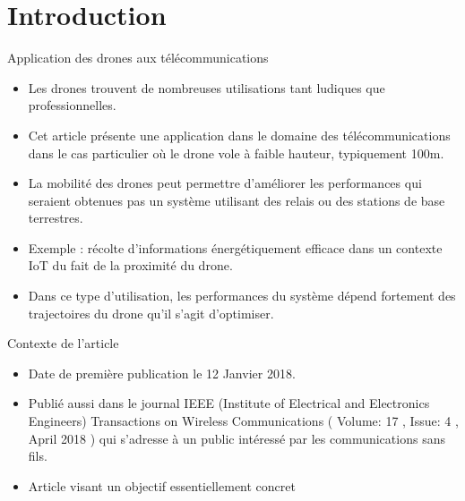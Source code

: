 

\section {Introduction}

\begin{frame}{Application des drones aux télécommunications}
\begin{itemize}
\item Les drones trouvent de nombreuses utilisations tant ludiques que professionnelles. 
\item Cet article présente une application dans le domaine des télécommunications dans le cas particulier où le drone vole à faible hauteur, typiquement 100m.
\item La mobilité des drones peut permettre d'améliorer les performances qui seraient obtenues pas un système
utilisant des relais ou des stations de base terrestres.
\item Exemple : récolte d'informations énergétiquement efficace dans un contexte IoT du fait de la proximité du drone.
\item Dans ce type d'utilisation, les performances du système dépend fortement des trajectoires du drone qu'il s'agit d'optimiser.
\end{itemize}
  

\end{frame}

\begin{frame}{Contexte de l'article}
\begin{itemize}
	
	\item Date de première publication le 12 Janvier 2018.
	
	\item Publié aussi dans le journal IEEE (Institute of Electrical and Electronics Engineers) Transactions on Wireless Communications 
	( Volume: 17 , Issue: 4 , April 2018 ) qui s'adresse à un public intéressé par les communications sans fils.
	
	\item Article visant un objectif essentiellement concret

	
\end{itemize}
\end{frame}

